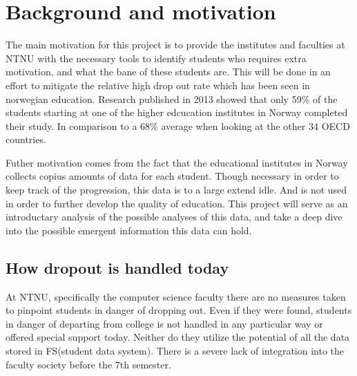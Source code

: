 \section{Background and motivation}
	The main motivation for this project is to provide the institutes and faculties at NTNU 
	with the necessary tools to identify students who requires extra motivation, and what the bane of these students are.
	This will be done in an effort to mitigate the relative high drop out rate which has been
	seen in norwegian education.
	Research published in 2013 showed that only 59\% of the students
	starting at one of the higher edcucation institutes in Norway completed their study.
	In comparison to a 68\% average when looking at the other 34 OECD countries.\cite{OECD2013}
	
	Futher motivation comes from the fact that the educational institutes in Norway collects
	copius amounts of data for each student. Though necessary in order to keep track of the progression, 
	this data is to a large extend idle. And is not used in order to further develop the quality of education. 
	This project will serve as an introductary analysis of the possible analyses of this data, 
	and take a deep dive into the possible emergent information this data can hold. 
	
\subsection{How dropout is handled today}
At NTNU, specifically the computer science faculty there are no measures taken to pinpoint students in danger of dropping out.
Even if they were found, students in danger of departing from college is not handled in any particular way or offered special support today.
Neither do they utilize the potential of all the data stored in FS(student data system).
There is a severe lack of integration into the faculty society before the 7th semester.